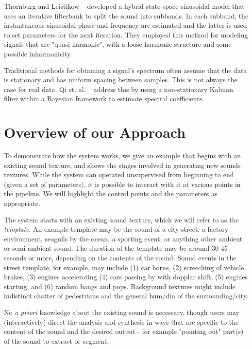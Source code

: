 \documentclass{acmsiggraph}               %
\begin{document}
Thornburg and Leistikow ~ developed a hybrid state-space sinusoidal 
model that uses an iterative filterbank to split the sound into subbands. In each subband, the 
instantaneous sinusoidal phase and frequency are estimated and the latter is used to set 
parameters for the next iteration. They employed this method for modeling signals that are 
"quasi-harmonic", with a loose harmonic structure and some possible inharmonicity. 

Traditional methods for obtaining a signal's spectrum often assume that the data is stationary 
and has uniform spacing between samples. This is not always the case for real data. Qi et. al. 
~ address this by using a non-stationary Kalman filter within a Bayesian 
framework to estimate spectral coefficients. 


\section{Overview of our Approach}

To demonstrate how the system works, we give an example that begins with 
an existing sound texture, and shows the stages involved in generating new 
sounds textures.    While the system can operated unsupervised from 
beginning to end (given a set of parameters), it is possible to interact 
with it at various points in the pipeline.  We will highlight the control 
points and the parameters as appropriate.

The system starts with an existing sound texture, which we will refer to as the
\textit{template}.  An example template may be the sound of a city street, a factory 
environment, seagulls by the ocean, a sporting event, or anything other
ambient or semi-ambient sound.  The duration of 
the template may be around 30-45 seconds or more, depending on the
contents of the sound.  Sound events in the street template, for example, 
may include (1) car horns, (2) screeching of vehicle brakes, (3) engines accelerating 
(4) cars passing by with dopplar shift, (5) engines starting, and (6) random
bangs and pops.  Background textures might include indistinct chatter of pedestrians
and the general hum/din of the surrounding/city.

No \textit{a priori} knowledge about the existing sound is necessary, 
though users may (interactively) direct the analysis and synthesis in 
ways that are specific to the content of the sound and the desired output - 
for example "pointing out" part(s) of the sound to extract or segment.
\end{document}
